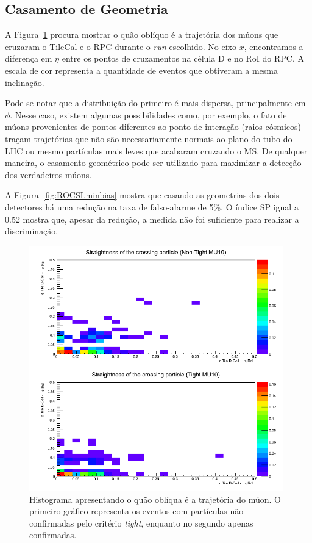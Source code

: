 \subsection*{Casamento de Geometria}

A Figura~\ref{crossgeominbias} procura mostrar o quão oblíquo é a trajetória dos múons
que cruzaram o TileCal e o RPC durante o \emph{run} escolhido. No eixo $x$,
encontramos a diferença em $\eta$ entre os pontos de cruzamentos na célula D e
no RoI do RPC. A escala de cor representa a quantidade de eventos que obtiveram
a mesma inclinação.

Pode-se notar que a distribuição do primeiro é mais dispersa, principalmente em
$\phi$. Nesse caso, existem algumas possibilidades como, por exemplo, o fato de
múons provenientes de pontos diferentes ao ponto de interação (raios cósmicos)
traçam trajetórias que não são necessariamente normais ao plano do tubo do LHC
ou mesmo partículas mais leves que acabaram cruzando o MS. De qualquer maneira,
o casamento geométrico pode ser utilizado para maximizar a detecção dos
verdadeiros múons.

A Figura~\ref{fig:ROCSLminbias} mostra que casando as geometrias dos dois
detectores há uma redução na taxa de falso-alarme de 5\%. O índice SP igual a
0.52 mostra que, apesar da redução, a medida não foi suficiente para realizar a
discriminação.

\begin{figure}[htpb!]
    \centering
    \includegraphics[width=11cm]{images/minbias/crossGeo.png}
    \caption{Histograma apresentando o quão oblíqua é a trajetória do múon. O
    primeiro gráfico representa os eventos com partículas não confirmadas pelo
    critério \emph{tight}, enquanto no segundo apenas confirmadas.}
    \label{crossgeominbias}
\end{figure}

